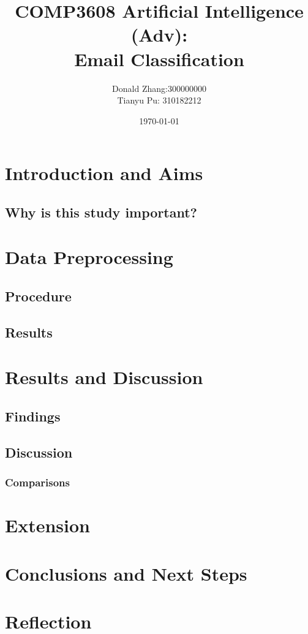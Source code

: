 \documentclass[12pt]{article}
\title{COMP3608 Artificial Intelligence (Adv): \\
Email Classification}
\author{Donald Zhang:300000000 
\\ Tianyu Pu: 310182212}
\date{\today}
\begin{document}
\maketitle

\section{Introduction and Aims}
\subsection{Why is this study important?}

\section{Data Preprocessing}
\subsection{Procedure}
\subsection{Results}

\section{Results and Discussion}
\subsection{Findings}
\subsection{Discussion}
\subsubsection{Comparisons}

\section{Extension}

\section{Conclusions and Next Steps}

\section{Reflection}



\end{document}
